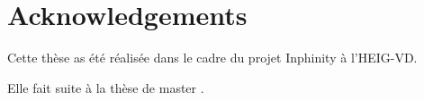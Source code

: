 \chapter*{Acknowledgements}

Cette thèse as été réalisée dans le cadre du projet Inphinity à l'HEIG-VD.

Elle fait suite à la thèse de master \thLeite .

 
